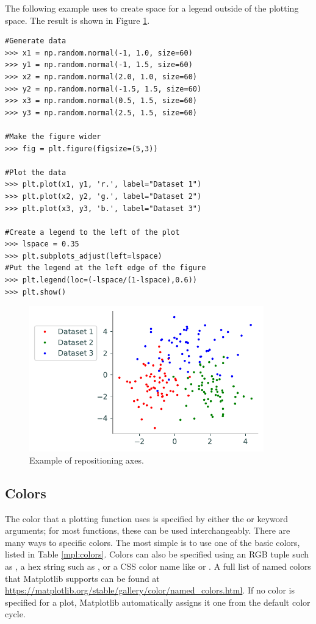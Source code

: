 The following example uses  to create space for a legend outside of the plotting space. The result is shown in Figure \ref{mpl:positioning}.
\begin{lstlisting}
#Generate data
>>> x1 = np.random.normal(-1, 1.0, size=60)
>>> y1 = np.random.normal(-1, 1.5, size=60)
>>> x2 = np.random.normal(2.0, 1.0, size=60)
>>> y2 = np.random.normal(-1.5, 1.5, size=60)
>>> x3 = np.random.normal(0.5, 1.5, size=60)
>>> y3 = np.random.normal(2.5, 1.5, size=60)

#Make the figure wider
>>> fig = plt.figure(figsize=(5,3))

#Plot the data
>>> plt.plot(x1, y1, 'r.', label="Dataset 1")
>>> plt.plot(x2, y2, 'g.', label="Dataset 2")
>>> plt.plot(x3, y3, 'b.', label="Dataset 3")

#Create a legend to the left of the plot
>>> lspace = 0.35
>>> plt.subplots_adjust(left=lspace)
#Put the legend at the left edge of the figure
>>> plt.legend(loc=(-lspace/(1-lspace),0.6))
>>> plt.show()
\end{lstlisting}
\begin{figure}[H]
\centering
\includegraphics[width=4in]{figures/positioning_example.pdf}
\caption{Example of repositioning axes.}
\label{mpl:positioning}
\end{figure}

\subsection*{Colors} %
The color that a plotting function uses is specified by either the  or  keyword arguments; for most functions, these can be used interchangeably.
There are many ways to specific colors.
The most simple is to use one of the basic colors, listed in Table \ref{mpl:colors}.
Colors can also be specified using an RGB tuple such as , a hex string such as , or a CSS color name like  or .
A full list of named colors that Matplotlib supports can be found at \url{https://matplotlib.org/stable/gallery/color/named_colors.html}.
If no color is specified for a plot, Matplotlib automatically assigns it one from the default color cycle.

